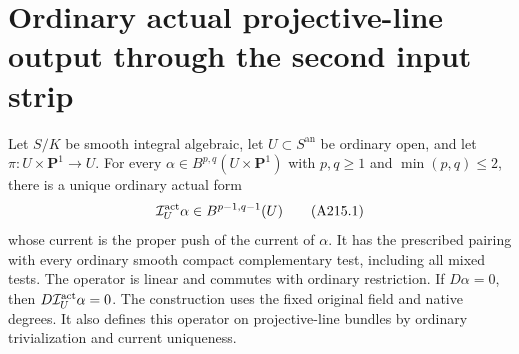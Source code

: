 \section{Ordinary actual projective-line output through the second input strip}
\label{r15a2:section}

\begin{theorem}
\label{r15a2:projection}
Let $S/K$ be smooth integral algebraic, let $U\subset S^{\mathrm{an}}$
be ordinary open, and let $\pi:U\times\mathbf P^1\to U$.
For every $\alpha\in B^{p,q}(U\times\mathbf P^1)$ with
$p,q\geq1$ and $\min(p,q)\leq2$, there is a unique ordinary
actual form
\[
                   \mathcal I^{\rm act}_U\alpha
                                  \in B^{p-1,q-1}(U)
\tag{A215.1}\label{r15a2:output}
\]
whose current is the proper push of the current of $\alpha$.
It has the prescribed pairing with every ordinary smooth compact
complementary test, including all mixed tests. The operator is
linear and commutes with ordinary restriction. If $D\alpha=0$,
then $D\mathcal I^{\rm act}_U\alpha=0$.
The construction uses the fixed original field and native degrees.
It also defines this operator on projective-line bundles by ordinary
trivialization and current uniqueness.
\end{theorem}

